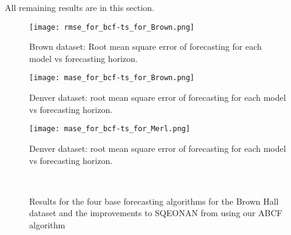 \label{app:results}
All remaining results are in this section. 

\begin{figure}[!ht]
	\begin{center}
		\texttt{[image: rmse\_for\_bcf-ts\_for\_Brown.png]}
	\end{center}
	\caption{Brown dataset: Root mean square error of forecasting for each model vs forecasting horizon.}
	\label{fig:rmseplotbrown}
\end{figure}

\begin{figure}[!ht]
	\begin{center}
		\texttt{[image: mase\_for\_bcf-ts\_for\_Brown.png]}
	\end{center}
	\caption{Denver dataset: root mean square error of forecasting for each model vs forecasting horizon.}
	\label{fig:maseplotbrown}
\end{figure}

\begin{figure}[!ht]
	\begin{center}
		\texttt{[image: mase\_for\_bcf-ts\_for\_Merl.png]}
	\end{center}
	\caption{Denver dataset: root mean square error of forecasting for each model vs forecasting horizon.}
	\label{fig:maseplotmerl}
\end{figure}




\begin{figure}[!h]
	\begin{center}
		 \\
	\end{center}
	\caption{Results for the four base forecasting algorithms for the Brown Hall dataset and the improvements to SQEONAN from using our ABCF algorithm}
	\label{fig:sqe_merl_results}
\end{figure}

